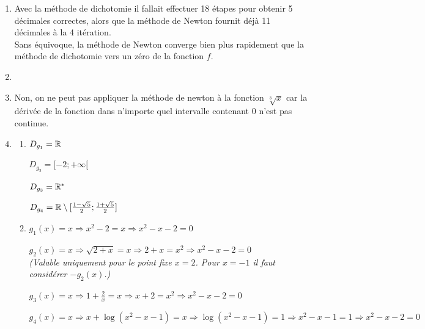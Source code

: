 \documentclass[11pt,a4paper,twoside]{report}
\begin{document}
\begin{enumerate}[label=R4.\arabic*, font=\bfseries, itemsep=8mm,labelsep*=4mm]
\medskip
Pour $u_4$ on obtient $\sqrt{2} \simeq 1,41421356237$
avec $11$ décimales exactes.







\item
Avec la méthode de dichotomie il fallait effectuer 18 étapes pour obtenir 5 décimales correctes, alors que la méthode de Newton fournit déjà 11 décimales à la 4 itération.\\
Sans équivoque, la méthode de Newton converge bien plus rapidement que la méthode de dichotomie vers un zéro de la fonction $f$. 







\item
{}







\item
Non, on ne peut pas appliquer la méthode de newton à la fonction $\sqrt[3]{x}$ car la dérivée de la fonction dans n'importe quel intervalle contenant 0 n'est pas continue.







\item
\begin{enumerate}[label=\roman*),itemsep=3mm]
\item $D_{g_1}=\mathbb{R}$

\smallskip
$D_{g_2}=[-2;+\infty[$

\smallskip
$D_{g_3}=\mathbb{R}^{\ast}$

\smallskip
$\textstyle D_{g_4}=\mathbb{R}\setminus [\frac{1-\sqrt{5}}{2};\frac{1+\sqrt{5}}{2}]$
\item $g_1(x)=x \Rightarrow x^2-2=x \Rightarrow x^2-x-2=0$

\smallskip
$g_2(x)=x \Rightarrow \sqrt{2+x}=x \Rightarrow 2+x=x^2 \Rightarrow x^2-x-2=0$\\
\textit{\small (Valable uniquement pour le point fixe $x=2$. Pour $x=-1$ il faut considérer $-g_2(x)$.)}

\smallskip
$g_3(x)=x \Rightarrow 1+\frac{2}{x}=x \Rightarrow x+2=x^2 \Rightarrow x^2-x-2=0$

\smallskip
$g_4(x)=x \Rightarrow x+\log(x^2-x-1)=x \Rightarrow \log(x^2-x-1)=1 \Rightarrow x^2-x-1=1  \Rightarrow x^2-x-2=0$


\end{enumerate}
\end{enumerate}
\end{document}
